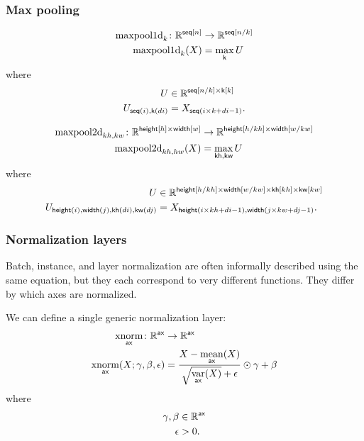 \documentclass{article}
\newcommand{\reals}{\mathbb{R}}
\begin{document}
\subsubsection{Max pooling}

\begin{align*}
\text{maxpool1d}_{k} \colon \mathbb{R}^{\mathsf{seq}[n]} &\rightarrow \mathbb{R}^{\mathsf{seq}[n/k]} \\
\text{maxpool1d}_{k}(X) &= \mathop{\underset{\mathsf{k}}{\mathrm{max}}} U
\end{align*}
where
\begin{align*}
U &\in \reals^{\nset{seq}{n / k} \times \nset{k}{k}} \\
U_{\nidx{seq}{i}, \nidx{k}{di}} & = X_{\nidx{seq}{i \times k + di -1}}.
\end{align*}


\begin{align*}
\text{maxpool2d}_{kh,kw} \colon \mathbb{R}^{\mathsf{height}[h] \times \mathsf{width}[w]} &\rightarrow \mathbb{R}^{\mathsf{height}[h/kh] \times \mathsf{width}[w/kw]} \\
\text{maxpool2d}_{kh,hw}(X) &= \mathop{\underset{\mathsf{kh, kw}}{\mathrm{max}}} U
\end{align*}
where
\begin{align*}
U &\in \reals^{\nset{height}{h / kh} \times \nset{width}{w / kw} \times \nset{kh}{kh} \times \nset{kw}{kw}} \\
U_{\nidx{height}{i}, \nidx{width}{j}, \nidx{kh}{di}, \nidx{kw}{dj}} & = X_{\nidx{height}{i \times kh + di -1}, \nidx{width}{j \times kw + dj -1}}.
\end{align*}

\subsubsection{Normalization layers}

Batch, instance, and layer normalization are often informally described using the same
equation, but they each correspond to very different functions. They differ
by which axes are normalized.

We can define a single generic normalization layer:
\begin{align*}
  \mathop{\underset{\mathsf{ax}}{\mathrm{xnorm}}} \colon \mathbb{R}^{\mathsf{ax}} &\rightarrow \mathbb{R}^{\mathsf{ax}} \\
  \mathop{\underset{\mathsf{ax}}{\mathrm{xnorm}}}(X; \gamma, \beta, \epsilon) &= \frac{X - \mathop{\underset{\mathsf{ax}}{\mathrm{mean}}}(X)}{\sqrt{\mathop{\underset{\mathsf{ax}}{\mathrm{var}}}(X)} + \epsilon} \odot \gamma + \beta
\end{align*}
where
\begin{align*}
  \gamma, \beta &\in \mathbb{R}^{\mathsf{ax}} \\
  \epsilon &> 0.
\end{align*}
\end{document}

